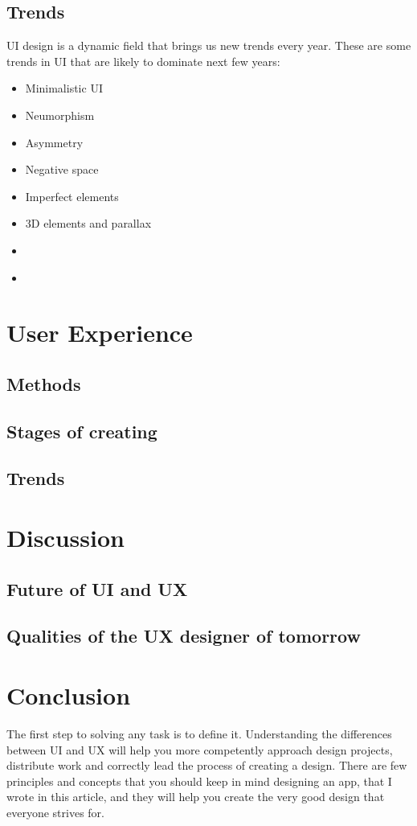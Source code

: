 \documentclass[10pt,twoside,english,a4paper]{article}
\begin{document}
\subsection{Trends}
UI design is a dynamic field that brings us new trends every year. These are some trends in UI that are likely to dominate next few years:
\begin{itemize}
\item Minimalistic UI
\item Neumorphism
\item Asymmetry
\item Negative space
\item Imperfect elements
\item 3D elements and parallax
\item
\item \cite{UItrends}
\end{itemize}

\section{User Experience} \label{UX}
\subsection{Methods}
\cite{AllUX}
\cite{WaterfallUX}
\subsection{Stages of creating}	
\cite{UXstages}
\subsection{Trends}

\section{Discussion}
\subsection{Future of UI and UX}
\cite{FutureDesign}
\subsection{Qualities of the UX designer of tomorrow}
\cite{DesignerTomorrow}
\section{Conclusion}
The first step to solving any task is to define it. Understanding the
differences between UI and UX will help you more competently approach design projects, distribute work and correctly lead the process of creating a design. There are few principles and concepts that you should keep in mind designing an app, that I wrote in this article, and they will help you create the very good design that everyone strives for.	
\end{document}
